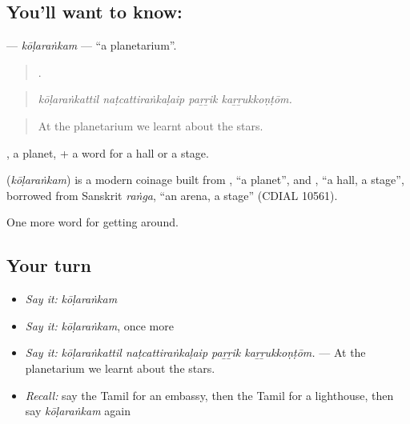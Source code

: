 \subsection*{You'll want to know: }
\textbf{} — \emph{kōḷaraṅkam} — \textquotedblleft{}a planetarium\textquotedblright{}.

\begin{quote}
   .
\end{quote}

\begin{quote}
\emph{kōḷaraṅkattil naṭcattiraṅkaḷaip paṟṟik kaṟṟukkoṇṭōm.}
\end{quote}

\begin{quote}
At the planetarium we learnt about the stars.
\end{quote}

, a planet, + a word for a hall or a stage.

\begin{cousinweb}
\textbf{} (\emph{kōḷaraṅkam}) is a modern coinage built from , \textquotedblleft{}a planet\textquotedblright{}, and , \textquotedblleft{}a hall, a stage\textquotedblright{}, borrowed from Sanskrit \emph{raṅga}, \textquotedblleft{}an arena, a stage\textquotedblright{} (CDIAL 10561).
\end{cousinweb}

\begin{grammarlens}[title={What you've built}]
One more word for getting around.
\end{grammarlens}

\subsection*{Your turn}
\begin{itemize}
\raggedright
  \item \emph{Say it:} \emph{kōḷaraṅkam}
  \item \emph{Say it:} \emph{kōḷaraṅkam}, once more
  \item \emph{Say it:} \emph{kōḷaraṅkattil naṭcattiraṅkaḷaip paṟṟik kaṟṟukkoṇṭōm.} — At the planetarium we learnt about the stars.
  \item \emph{Recall:} say the Tamil for an embassy, then the Tamil for a lighthouse, then say \emph{kōḷaraṅkam} again
\end{itemize}

